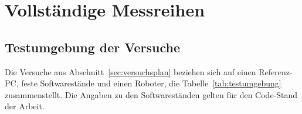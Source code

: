 \chapter{Vollständige Messreihen}
\label{app:messreihen}

\section{Testumgebung der Versuche}
\label{anh:testumgebung}
Die Versuche aus Abschnitt~\ref{sec:versuchsplan} beziehen sich auf einen Referenz-PC, feste Softwarestände und einen Roboter, die Tabelle~\ref{tab:testumgebung} zusammenstellt.
Die Angaben zu den Softwareständen gelten für den Code-Stand der Arbeit.

